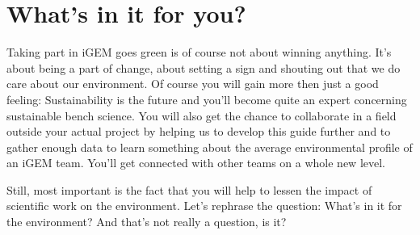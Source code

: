 \section{What's in it for you?}

Taking part in iGEM goes green is of course not about winning anything. It's about being a part of change, about setting a sign and shouting out that we do care about our environment. Of course you will gain more then just a good feeling: Sustainability is the future and you'll become quite an expert concerning sustainable bench science. You will also get the chance to collaborate in a field outside your actual project by helping us to develop this guide further and to gather enough data to learn something about the average environmental profile of an iGEM team. You'll get connected with other teams on a whole new level.

Still, most important is the fact that you will help to lessen the impact of scientific work on the environment. Let's rephrase the question: What's in it for the environment? And that's not really a question, is it?

